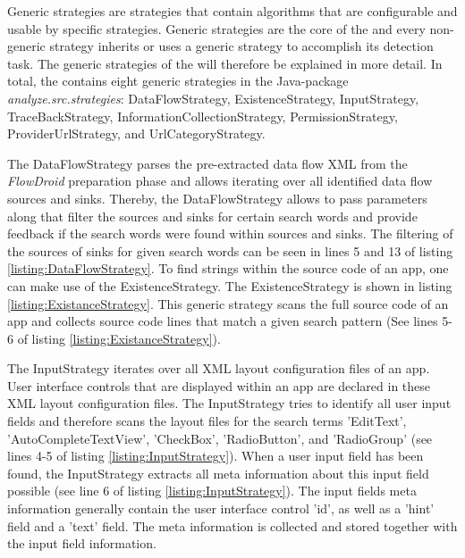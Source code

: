 Generic strategies are strategies that contain algorithms that are configurable and usable by specific strategies.
Generic strategies are the core of the \aiprat and every non-generic strategy inherits or uses a generic strategy to accomplish its \ipr detection task.
The generic strategies of the \aiprat will therefore be explained in more detail.
In total, the \aiprat contains eight generic strategies in the Java-package \textit{analyze.src.strategies}: DataFlowStrategy, ExistenceStrategy, InputStrategy, TraceBackStrategy, InformationCollectionStrategy, PermissionStrategy, ProviderUrlStrategy, and UrlCategoryStrategy.


The DataFlowStrategy parses the pre-extracted data flow \acs{XML} from the \textit{FlowDroid} preparation phase and allows iterating over all identified data flow sources and sinks.
Thereby, the DataFlowStrategy allows to pass parameters along that filter the sources and sinks for certain search words and provide feedback if the search words were found within sources and sinks.
The filtering of the sources of sinks for given search words can be seen in lines 5 and 13 of listing \ref{listing:DataFlowStrategy}.
To find strings within the source code of an app, one can make use of the ExistenceStrategy.
The ExistenceStrategy is shown in listing \ref{listing:ExistanceStrategy}.
This generic strategy scans the full source code of an app and collects source code lines that match a given search pattern (See lines 5-6 of listing \ref{listing:ExistanceStrategy}).
 

The InputStrategy iterates over all \acs{XML} layout configuration files of an app. 
User interface controls that are displayed within an app are declared in these \acs{XML} layout configuration files.
The InputStrategy tries to identify all user input fields and therefore scans the layout files for the search terms 'EditText', 'AutoCompleteTextView', 'CheckBox', 'RadioButton', and 'RadioGroup' (see lines 4-5 of listing \ref{listing:InputStrategy}).
When a user input field has been found, the InputStrategy extracts all meta information about this input field possible (see line 6 of listing \ref{listing:InputStrategy}).
The input fields meta information generally contain the user interface control 'id', as well as a 'hint' field and a 'text' field. 
The meta information is collected and stored together with the input field information.


